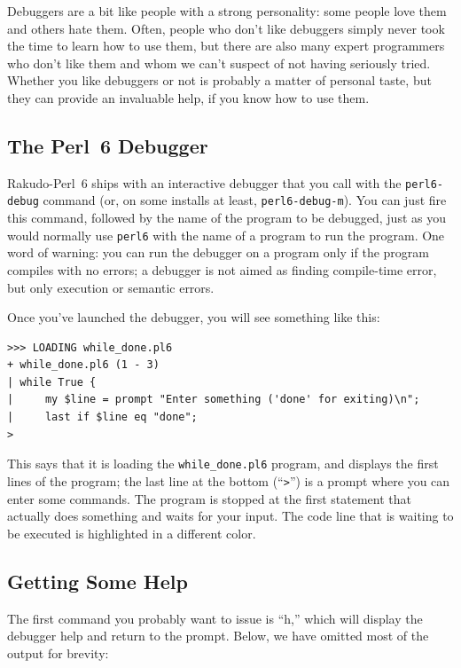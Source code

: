 Debuggers are a bit like people with a strong personality: 
some people love them and others hate them. Often, people 
who don't like debuggers simply never took the time to learn 
how to use them, but there are also many expert programmers 
who don't like them and whom we can't suspect of not having 
seriously tried. Whether you like debuggers or not is 
probably a matter of personal taste, but they can provide an 
invaluable help, if you know how to use them.

\subsection{The Perl~6 Debugger}

Rakudo-Perl~6 ships with an interactive debugger that 
you call with the {\tt perl6-debug} command (or, on 
some installs at least, {\tt perl6-debug-m}). You can 
just fire this command, followed by the name of the program 
to be debugged, just as you would normally use {\tt perl6} with 
the name of a program to run the program. One word of 
warning: you can run the debugger on a program only if 
the program compiles with no errors; a debugger is not 
aimed as finding compile-time error, but only execution 
or semantic errors.

Once you've launched the debugger, you will see something 
like this:

\begin{verbatim}
>>> LOADING while_done.pl6
+ while_done.pl6 (1 - 3)
| while True {
|     my $line = prompt "Enter something ('done' for exiting)\n";
|     last if $line eq "done";
>
\end{verbatim}

This says that it is loading the \verb'while_done.pl6' program, 
and displays the first lines of the program; the last line at 
the bottom (``\verb">"'') is a prompt where you can enter some 
commands. The program 
is stopped at the first statement that actually does something 
and waits for your input. The code line that is waiting to be 
executed is highlighted in a different color.

\subsection{Getting Some Help}

The first command you probably want to issue is ``h,'' which 
will display the debugger help and return to the prompt. 
Below, we have omitted most of the output for brevity:


